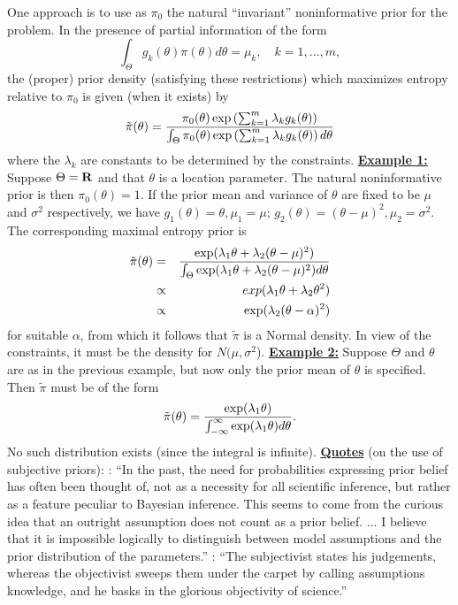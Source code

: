 \documentclass[12pt]{article}
\def\ni{\noindent}
\begin{document}
\vskip 4mm
One approach is to use as $\pi_0$ the natural ``invariant''
noninformative prior for the problem.  In the presence of partial
information of the form
$$\int_{\Theta} g_k(\theta) \pi(\theta) d\theta = \mu_k, \quad k=1,
\ldots, m,$$
the (proper) prior density (satisfying these restrictions) which
maximizes entropy relative to $\pi_0$ is given (when it
exists) by
$$\tilde{\pi} (\theta)={\pi_0 (\theta) \exp \left( \sum_{k=1}^m
    \lambda_k g_k(\theta) \right) \over \int_{\Theta} \pi_0 (\theta)
  \exp \left( \sum_{k=1}^m \lambda_k g_k(\theta) \right) d\theta}$$
where the $\lambda_k$ are constants to be determined by the
constraints.
\vskip 4mm
\ni\underline{\bf Example 1:}~~  Suppose $\Theta={\bf R}$ and that $\theta$
is a location parameter.  The natural noninformative prior is then
$\pi_0 (\theta)=1$.  If the prior mean and variance of $\theta$ are
fixed to be $\mu$ and $\sigma^2$ respectively, we have
$g_1(\theta)=\theta,\mu_1=\mu$; $g_2(\theta)=(\theta-\mu)^2,
\mu_2=\sigma^2$.  The corresponding
maximal entropy prior is
\begin{eqnarray*}
\tilde{\pi} (\theta)&=&{\exp(\lambda_1 \theta + \lambda_2
  (\theta-\mu)^2) \over \int_\Theta \exp(\lambda_1 \theta + \lambda_2
  (\theta-\mu)^2) d\theta}\\
&\propto&\ exp(\lambda_1 \theta + \lambda_2 \theta^2) \\
&\propto& \exp(\lambda_2 (\theta-\alpha)^2)
\end{eqnarray*}
for suitable $\alpha$, from which it follows that $\tilde{\pi}$ is a Normal
density.  In view of the constraints, it must be the density for
$N(\mu,\sigma^2$).
\vskip 4mm
\ni\underline{\bf Example 2:}  Suppose $\Theta$ and $\theta$ are as in
the previous example, but now only the prior mean of $\theta$ is
specified.  Then $\tilde{\pi}$ must be of the form
$$\tilde{\pi} (\theta)={\exp(\lambda_1 \theta) \over
  \int_{-\infty}^\infty \exp (\lambda_1 \theta) d\theta}.$$
No such distribution exists (since the integral is infinite).
\vskip 12mm
\ni\underline{\bf Quotes} (on the use of subjective priors):
\vskip 4mm
\ni{\it George Box}: ``In the past, the need for probabilities expressing
prior belief has often been thought of, not as a necessity for all
scientific inference, but rather as a feature peculiar to Bayesian
inference.  This seems to come from the curious idea that an outright
assumption does not count as a prior belief.  $\ldots$ I believe that it is
impossible logically to distinguish between model assumptions and the
prior distribution of the parameters.''
\vskip 4mm
\ni{\it I.J.Good}: ``The subjectivist states his judgements, whereas the
objectivist sweeps them under the carpet by calling assumptions
knowledge, and he basks in the glorious objectivity of science.''
\vskip 6mm
\end{document}
